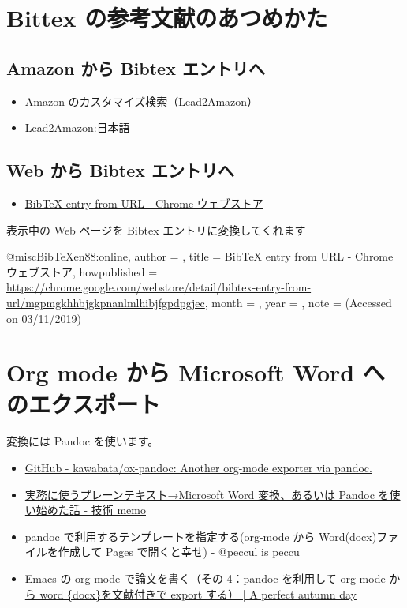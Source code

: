 \documentclass[a4j,12pt,openany,uplatex,dvipdfmx]{jsbook}
\begin{document}
\chapter{Bittex の参考文献のあつめかた}
\label{sec:org87fd7b7}
\section{Amazon から Bibtex エントリへ}
\label{sec:orgfd55f4a}
\begin{itemize}
\item \href{http://lead.to/amazon/jp/search/use.htm}{Amazon のカスタマイズ検索（Lead2Amazon）}
\item \href{http://lead.to/amazon/jp/}{Lead2Amazon:日本語}
\end{itemize}

\section{Web から Bibtex エントリへ}
\label{sec:orgeb662c9}
\begin{itemize}
\item \href{https://chrome.google.com/webstore/detail/bibtex-entry-from-url/mgpmgkhhbjgkpnanlmlhibjfgpdpgjec}{BibTeX entry from URL - Chrome ウェブストア}
\end{itemize}


表示中の Web ページを Bibtex エントリに変換してくれます

@misc{BibTeXen88:online,
author = {},
title = {BibTeX entry from URL - Chrome ウェブストア},
howpublished = {\url{https://chrome.google.com/webstore/detail/bibtex-entry-from-url/mgpmgkhhbjgkpnanlmlhibjfgpdpgjec}},
month = {},
year = {},
note = {(Accessed on 03/11/2019)}
}

\chapter{Org mode から Microsoft Word へのエクスポート}
\label{sec:org174b830}
変換には Pandoc を使います。
\begin{itemize}
\item \href{https://github.com/kawabata/ox-pandoc}{GitHub - kawabata/ox-pandoc: Another org-mode exporter via pandoc.}
\item \href{http://nenono.hatenablog.com/entry/2015/02/10/173516}{実務に使うプレーンテキスト→Microsoft Word 変換、あるいは Pandoc を使い始めた話 - 技術 memo}
\item \href{http://peccu.hatenablog.com/entry/2015/05/12/000000}{pandoc で利用するテンプレートを指定する(org-mode から Word(docx)ファイルを作成して Pages で開くと幸せ) - @peccul is peccu}
\item \href{https://taipapamotohus.com/post/org-mode\_paper\_4/}{Emacs の org-mode で論文を書く（その 4：pandoc を利用して org-mode から word \{docx\}を文献付きで export する） | A perfect autumn day}
\end{itemize}
\end{document}
